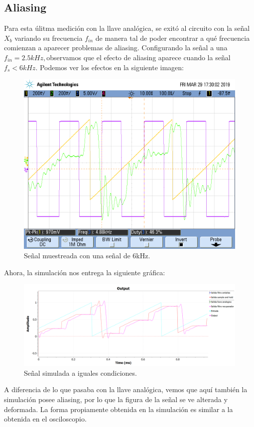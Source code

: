 \documentclass[../../ASSD_TP1_G7.tex]{subfiles}
\begin{document}
\subsection{Aliasing}

Para esta úlitma medición con la llave analógica, se exitó al circuito
con la señal $X_{b}$ variando su frecuencia $f_{in}$ de manera tal
de poder encontrar a qué frecuencia comienzan a aparecer problemas
de aliasing. Configurando la señal a una $f_{in}=2.5kHz,$observamos
que el efecto de aliasing aparece cuando la señal $f_{s}<6kHz$. Podemos
ver los efectos en la siguiente imagen:

\begin{figure}[H]
\begin{centering}
\includegraphics[scale=0.5]{Imagenes/yh_pt6d_cuad2}
\par\end{centering}
\caption{Señal muestreada con una señal de 6kHz.}
\end{figure}

Ahora, la simulación nos entrega la siguiente gráfica:

\begin{figure}[H]

\begin{centering}
\includegraphics[scale=0.5]{Imagenes/simulacion_syh_diente_d}\caption{Señal simulada a iguales condiciones.}
\par\end{centering}
\end{figure}

A diferencia de lo que pasaba con la llave analógica, vemos que aquí
también la simulación posee aliasing, por lo que la figura de la señal
se ve alterada y deformada. La forma propiamente obtenida en la simulación
es similar a la obtenida en el osciloscopio.
\end{document}
